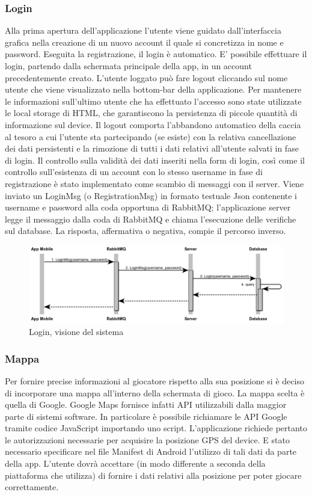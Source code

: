 \documentclass[12pt, italian]{article}
\begin{document}
\subsubsection*{Login}
Alla prima apertura dell'applicazione l'utente viene guidato dall'interfaccia grafica nella creazione di un nuovo account il quale si concretizza in nome e password. Eseguita la registrazione, il login è automatico.
E' possibile effettuare il login, partendo dalla schermata principale della app, in un account precedentemente creato.
L'utente loggato può fare logout cliccando sul nome utente che viene visualizzato nella bottom-bar della applicazione.
Per mantenere le informazioni sull'ultimo utente che ha effettuato l'accesso sono state utilizzate le local storage di HTML, che garantiscono la persistenza di piccole quantità di informazione sul device. Il logout comporta l'abbandono automatico della caccia al tesoro a cui l'utente sta partecipando (se esiste) con la relativa cancellazione dei dati persistenti e la rimozione di tutti i dati relativi all'utente salvati in fase di login.
Il controllo sulla validità dei dati inseriti nella form di login, così come il controllo sull'esistenza di un account con lo stesso username in fase di registrazione è stato implementato come scambio di messaggi con il server.
Viene inviato un LoginMsg (o RegistrationMsg) in formato testuale Json contenente i username e password alla coda opportuna di RabbitMQ; l'applicazione server legge il messaggio dalla coda di RabbitMQ e chiama l'esecuzione delle verifiche sul database. La risposta, affermativa o negativa, compie il percorso inverso.

\begin{figure}[H]
	\centering
	\includegraphics[width=1\textwidth]{img/diagram03.png}
	\caption{Login, visione del sistema}
\end{figure}

\subsubsection*{Mappa}
Per fornire precise informazioni al giocatore rispetto alla sua posizione si è deciso di incorporare una mappa all'interno della schermata di gioco.
La mappa scelta è quella di Google. Google Maps fornisce infatti API utilizzabili dalla maggior parte di sistemi software. In particolare è possibile richiamare le API Google tramite codice JavaScript importando uno script.
L'applicazione richiede pertanto le autorizzazioni necessarie per acquisire la posizione GPS del device. E stato necessario specificare nel file Manifest di Android l'utilizzo di tali dati da parte della app. L'utente dovrà accettare (in modo differente a seconda della piattaforma che utilizza) di fornire i dati relativi alla posizione per poter giocare correttamente.
\end{document}
